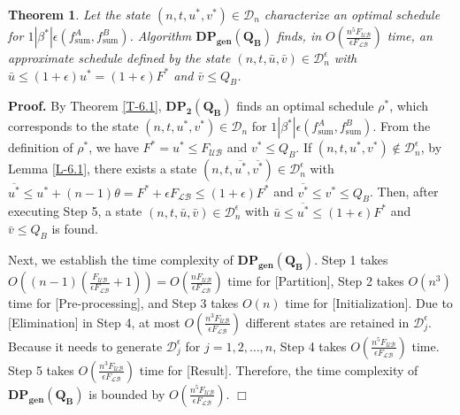 \documentclass[12pt]{article}
\newtheorem{theorem}{Theorem}[section]
\begin{document}
\begin{sloppypar}
\begin{theorem} \label{T-6.2}
Let the state $(n, t, u^{*}, v^{*}) \in \mathcal{D}_n$ characterize an optimal schedule for $1 | \beta^{*}|\epsilon(f_{\mathrm{sum}}^A, f_{\mathrm{sum}}^B)$. 
Algorithm $\mathbf{DP_{gen}(Q_B)}$ finds, in $O(\frac{n^5 F_{\mathcal{UB}}}{\epsilon F_{\mathcal{LB}}})$ time, an approximate schedule defined by the state $(n, t, \bar{u}, \bar{v}) \in \mathcal{D}_n^{\epsilon}$
with $\bar{u} \leq (1+\epsilon) u^{*}=(1+\epsilon) F^{*}$ and $\bar{v} \leq Q_B$.
\end{theorem}

\noindent\textbf{Proof.} By Theorem \ref{T-6.1}, $\mathbf{DP_2(Q_B)}$ finds an optimal schedule $\rho^{*}$, which corresponds to the state $(n, t, u^{*}, v^{*}) \in \mathcal{D}_n$ for $1 | \beta^{*}|\epsilon(f_{\mathrm{sum}}^A, f_{\mathrm{sum}}^B)$.
From the definition of $\rho^{*}$, we have $F^{*}=u^{*} \leq F_{\mathcal{UB}}$ and $v^{*} \leq Q_B$.
If $(n, t, u^{*}, v^{*})\notin \mathcal{D}_n^{\epsilon}$, by Lemma \ref{L-6.1}, there exists a state
$(n, t, \overline{u^{*}}, \overline{v^{*}}) \in \mathcal{D}_n^{\epsilon}$ with
$\overline{u^{*}} \leq u^{*}+(n-1) \theta =F^{*} +\epsilon F_{\mathcal{LB}} \leq (1+\epsilon) F^{*}$
and $\overline{v^{*}} \leq v^{*} \leq Q_B$. Then, after executing Step 5, a state
$(n, t, \bar{u}, \bar{v}) \in \mathcal{D}_n^{\epsilon}$ with $\bar{u} \leq \overline{u^{*}} \leq (1+\epsilon) F^{*}$ and $\bar{v} \leq Q_B$ is found.

Next, we establish the time complexity of $\mathbf{DP_{gen}(Q_B)}$. Step 1 takes $O((n-1) (\frac{F_{\mathcal{UB}}}{\epsilon F_{\mathcal{LB}}}+1))=O(\frac{nF_{\mathcal{UB}}}{\epsilon F_{\mathcal{LB}}})$ time for [Partition], Step 2 takes $O(n^3)$ time for [Pre-processing], and Step 3 takes $O(n)$ time for [Initialization]. Due to [Elimination] in Step 4, at most $O(\frac{n^3 F_{\mathcal{UB}}}{\epsilon F_{\mathcal{LB}}})$ different states are retained in $\mathcal{D}_{j}^{\epsilon}$. Because it needs to generate $\mathcal{D}_{j}^{\epsilon}$ for
$j=1, 2, \ldots, n$, Step 4 takes $O(\frac{n^5 F_{\mathcal{UB}}}{\epsilon F_{\mathcal{LB}}})$ time.
Step 5 takes $O(\frac{n^3 F_{\mathcal{UB}}}{\epsilon F_{\mathcal{LB}}})$ time for [Result].
Therefore, the time complexity of $\mathbf{DP_{gen}(Q_B)}$ is bounded by
$O(\frac{n^5 F_{\mathcal{UB}}}{\epsilon F_{\mathcal{LB}}})$.  \hfill$\Box$\\


\end{sloppypar}
\end{document}
